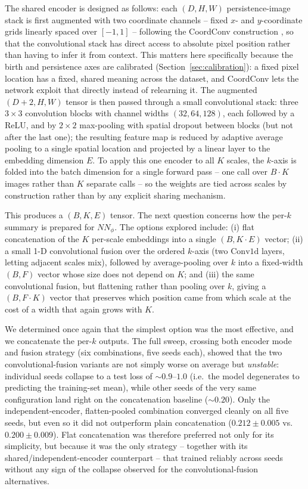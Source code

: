 The shared encoder is designed as follows: each $(D, H, W)$ persistence-image stack is first augmented with two coordinate channels -- fixed $x$- and $y$-coordinate grids linearly spaced over $[-1, 1]$ -- following the CoordConv construction \citep{liu2018coordconv}, so that the convolutional stack has direct access to absolute pixel position rather than having to infer it from context. This matters here specifically because the birth and persistence axes are calibrated (Section~\ref{sec:calibration}): a fixed pixel location has a fixed, shared meaning across the dataset, and CoordConv lets the network exploit that directly instead of relearning it. The augmented $(D+2, H, W)$ tensor is then passed through a small convolutional stack: three $3\times3$ convolution blocks with channel widths $(32, 64, 128)$, each followed by a ReLU, and by $2\times2$ max-pooling with spatial dropout between blocks (but not after the last one); the resulting feature map is reduced by adaptive average pooling to a single spatial location and projected by a linear layer to the embedding dimension $E$. To apply this one encoder to all $K$ scales, the $k$-axis is folded into the batch dimension for a single forward pass -- one call over $B \cdot K$ images rather than $K$ separate calls -- so the weights are tied across scales by construction rather than by any explicit sharing mechanism.

This produces a $(B, K, E)$ tensor. The next question concerns how the per-$k$ summary is prepared for $NN_\phi$. The options explored include: (i) flat concatenation of the $K$ per-scale embeddings into a single $(B, K \cdot E)$ vector; (ii) a small 1-D convolutional fusion over the ordered $k$-axis (two $\text{Conv1d}$ layers, letting adjacent scales mix), followed by average-pooling over $k$ into a fixed-width $(B, F)$ vector whose size does not depend on $K$; and (iii) the same convolutional fusion, but flattening rather than pooling over $k$, giving a $(B, F \cdot K)$ vector that preserves which position came from which scale at the cost of a width that again grows with $K$.

We determined once again that the simplest option was the most effective, and we concatenate the per-$k$ outputs. The full sweep, crossing both encoder mode and fusion strategy (six combinations, five seeds each), showed that the two convolutional-fusion variants are not simply worse on average but \emph{unstable}: individual seeds collapse to a test loss of $\sim\!0.9$--$1.0$ (i.e.\ the model degenerates to predicting the training-set mean), while other seeds of the very same configuration land right on the concatenation baseline ($\sim\!0.20$). Only the independent-encoder, flatten-pooled combination converged cleanly on all five seeds, but even so it did not outperform plain concatenation ($0.212 \pm 0.005$ vs.\ $0.200 \pm 0.009$). Flat concatenation was therefore preferred not only for its simplicity, but because it was the only strategy -- together with its shared/independent-encoder counterpart -- that trained reliably across seeds without any sign of the collapse observed for the convolutional-fusion alternatives.

